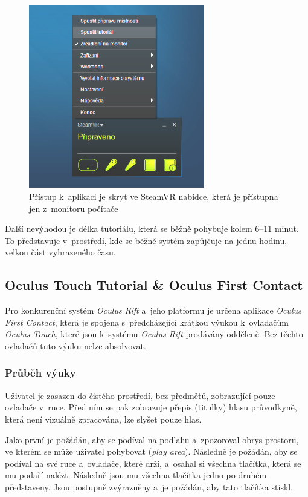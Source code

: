 \begin{figure}[h!]
\centering
\includegraphics[height=8cm]{src/assets/hidden-menu.png}
\caption{Přístup k~aplikaci je skryt ve SteamVR nabídce, která je
přístupna jen z~monitoru počítače}
\end{figure}

Další nevýhodou je délka tutoriálu, která se běžně pohybuje kolem 6--11
minut. To představuje v~prostředí, kde se běžně systém zapůjčuje na
jednu hodinu, velkou část vyhrazeného času.

\subsection{Oculus Touch Tutorial \& Oculus First
Contact}\label{oculus-touch-tutorial-oculus-first-contact}

Pro konkurenční systém \emph{Oculus Rift} a~jeho platformu je určena
aplikace \emph{Oculus First Contact}, která je spojena s~předcházející
krátkou výukou k~ovladačům \emph{Oculus Touch}, které jsou k~systému
\emph{Oculus Rift} prodávány odděleně. Bez těchto ovladačů tuto výuku
nelze absolvovat.

\subsubsection{Průběh výuky}\label{prux16fbux11bh-vuxfduky-1}

Uživatel je zasazen do čistého prostředí, bez předmětů, zobrazující
pouze ovladače v~ruce. Před ním se pak zobrazuje přepis (titulky) hlasu
průvodkyně, která není vizuálně zpracována, lze slyšet pouze hlas.

Jako první je požádán, aby se podíval na podlahu a~zpozoroval obrys
prostoru, ve kterém se může uživatel pohybovat (\emph{play area}).
Následně je požádán, aby se podíval na své ruce a~ovladače, které drží,
a~osahal si všechna tlačítka, která se mu podaří nalézt. Následně jsou
mu všechna tlačítka jedno po druhém představeny. Jsou postupně
zvýrazněny a~je požádán, aby tato tlačítka stiskl.

